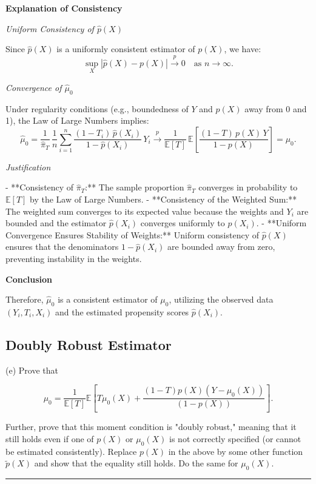 \documentclass{article}
\newenvironment{colorparagraph}[1]{\par\color{#1}}{\par}
\begin{document}
\textbf{Explanation of Consistency}

\textit{Uniform Consistency of \(\hat{p}(X)\)}

Since \(\hat{p}(X)\) is a uniformly consistent estimator of \(p(X)\), we have:
\[
\sup_{X} | \hat{p}(X) - p(X) | \xrightarrow{p} 0 \quad \text{as } n \to \infty.
\]

\textit{Convergence of \(\hat{\mu}_0\)}

Under regularity conditions (e.g., boundedness of \(Y\) and \(p(X)\) away from 0 and 1), the Law of Large Numbers implies:
\[
\hat{\mu}_0 = \frac{1}{\hat{\pi}_T} \, \frac{1}{n} \sum_{i=1}^n \frac{(1 - T_i) \, \hat{p}(X_i)}{1 - \hat{p}(X_i)} \, Y_i \xrightarrow{p} \frac{1}{\mathbb{E}[T]} \, \mathbb{E}\left[ \frac{(1 - T) \, p(X) \, Y}{1 - p(X)} \right] = \mu_0.
\]

\textit{Justification}

- **Consistency of \(\hat{\pi}_T\):** The sample proportion \(\hat{\pi}_T\) converges in probability to \(\mathbb{E}[T]\) by the Law of Large Numbers.
- **Consistency of the Weighted Sum:** The weighted sum converges to its expected value because the weights and \(Y_i\) are bounded and the estimator \(\hat{p}(X_i)\) converges uniformly to \(p(X_i)\).
- **Uniform Convergence Ensures Stability of Weights:** Uniform consistency of \(\hat{p}(X)\) ensures that the denominators \(1 - \hat{p}(X_i)\) are bounded away from zero, preventing instability in the weights.

\textbf{Conclusion}

Therefore, \(\hat{\mu}_0\) is a consistent estimator of \(\mu_0\), utilizing the observed data \((Y_i, T_i, X_i)\) and the estimated propensity scores \(\hat{p}(X_i)\).

\begin{colorparagraph}{questioncolor}
\label{q2e}\subsection{Doubly Robust Estimator}
(e) Prove that 

\[
\mu_0 = \frac{1}{\mathbb{E}[T]} \mathbb{E} \left[ T \mu_0(X) + \frac{(1 - T)p(X)(Y - \mu_0(X))}{(1 - p(X))} \right].
\]

Further, prove that this moment condition is "doubly robust," meaning that it still holds even if one of \( p(X) \) or \( \mu_0(X) \) is not correctly specified (or cannot be estimated consistently). Replace \( p(X) \) in the above by some other function \( \tilde{p}(X) \) and show that the equality still holds. Do the same for \( \mu_0(X) \).

\rule{\textwidth}{0.5pt}
\end{colorparagraph}
\end{document}
